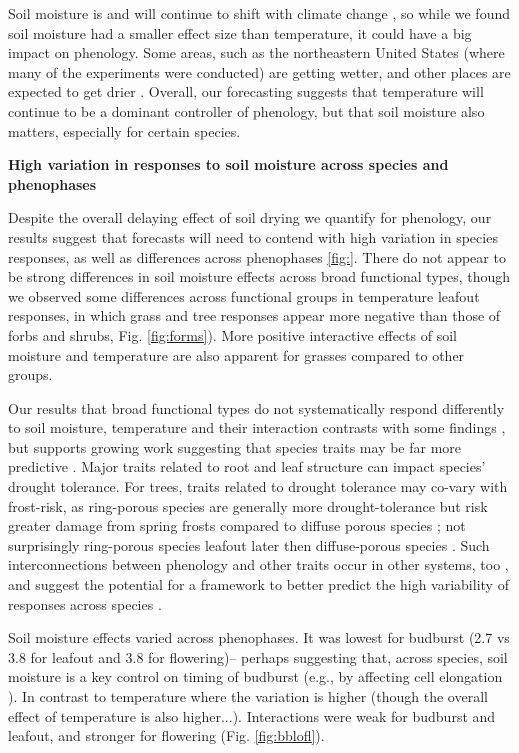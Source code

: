 \documentclass{article}
\begin{document}
\par Soil moisture is and will continue to shift with climate change \citep{berg2017}, so while we found soil moisture had a smaller effect size than temperature, it could have a big impact on phenology. Some areas, such as the northeastern United States (where many of the experiments were conducted) are getting wetter, and other places are expected to get drier \citep{berg2017}. Overall, our forecasting suggests that temperature will continue to be a dominant controller of phenology, but that soil moisture also matters, especially for certain species. 
\par \textbf {High variation in responses to soil moisture across species and phenophases}
\par Despite the overall delaying effect of soil drying we quantify for phenology, our results suggest that forecasts will need to contend with high variation in species responses, as well as differences across phenophases \ref{fig:}. There do not appear to be strong differences in soil moisture effects across broad functional types, though we observed some differences across functional groups in temperature leafout responses, in which grass and tree responses appear more negative than those of forbs and shrubs, Fig. \ref{fig:forms}). More positive interactive effects of soil moisture and temperature are also apparent for grasses compared to other groups.  
\par Our results that broad functional types do not systematically respond differently to soil moisture, temperature and their interaction contrasts with some findings \citep[e.g.,][]{rollinson2012,castillioni2022effects}, but supports growing work suggesting that species traits may be far more predictive \cite[e.g., ][]{diaz2016global}. Major traits related to root and leaf structure can impact species' drought tolerance. For trees, traits related to drought tolerance may co-vary with frost-risk, as ring-porous species are generally more drought-tolerance but risk greater damage from spring frosts compared to diffuse porous species \citep{bader2022less,wang2022contrast}; not surprisingly ring-porous species leafout later then diffuse-porous species \cite{lechowicz1984}. Such interconnections between phenology and other traits occur in other systems, too \citep[e.g.,][]{ocheltree2020identification}, and suggest the potential for a framework to better predict the high variability of responses across species \citep[e.g.,][]{morales2024phylogenetic}.

\par Soil moisture effects varied across phenophases. It was lowest for budburst (2.7 vs 3.8 for leafout and  3.8 for flowering)-- perhaps suggesting that, across species, soil moisture is a key control on timing of budburst (e.g., by affecting cell elongation \citep{essiamah1986}). In contrast to temperature where the variation is higher (though the overall effect of temperature is also higher...). 
Interactions were weak for budburst and leafout, and stronger for flowering (Fig. \ref{fig:bblofl}).
\end{document}
